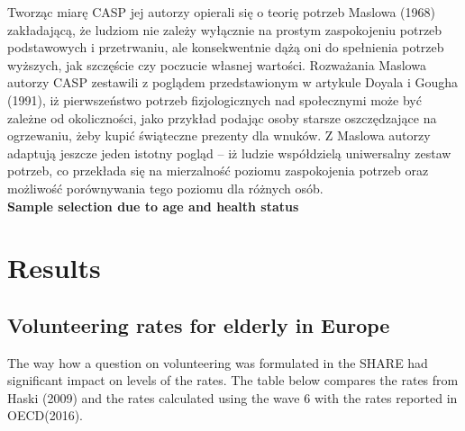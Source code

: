 \documentclass[10pt, letterpaper]{article}
\begin{document}
\begin{spacing}{1.4}
Tworząc miarę CASP jej autorzy opierali się o teorię potrzeb Maslowa (1968) zakładającą, że ludziom nie zależy wyłącznie na prostym zaspokojeniu potrzeb podstawowych i przetrwaniu, ale konsekwentnie dążą oni do spełnienia potrzeb wyższych, jak szczęście czy poczucie własnej wartości. Rozważania Maslowa autorzy CASP zestawili z poglądem przedstawionym w artykule Doyala i Gougha (1991), iż pierwszeństwo potrzeb fizjologicznych nad społecznymi może być zależne od okoliczności, jako przykład podając osoby starsze oszczędzające na ogrzewaniu, żeby kupić świąteczne prezenty dla wnuków. Z Maslowa autorzy adaptują jeszcze jeden istotny pogląd – iż ludzie współdzielą uniwersalny zestaw potrzeb, co przekłada się na mierzalność poziomu zaspokojenia potrzeb oraz możliwość porównywania tego poziomu dla różnych osób.  \\




\textbf{Sample selection due to age and health status }\\

\section{Results}

\subsection*{Volunteering rates for elderly in Europe}

The way how a question on volunteering was formulated in the SHARE had significant impact on levels of the rates. The table below compares the rates from Haski (2009) and the rates calculated using the wave 6 with the rates reported in OECD(2016).



\end{spacing}
\end{document}
